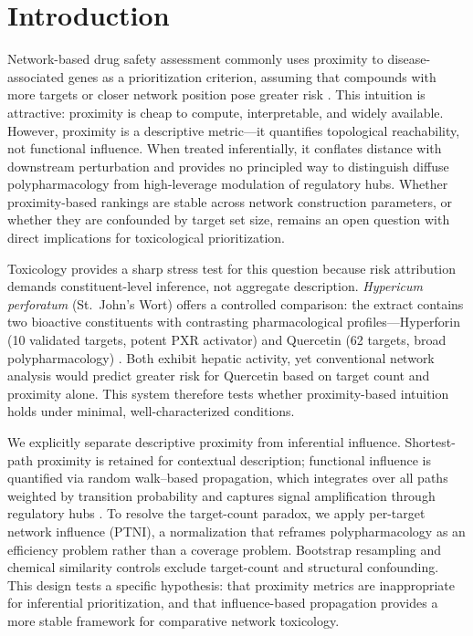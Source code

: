 \section{Introduction}

Network-based drug safety assessment commonly uses proximity to disease-associated genes as a prioritization criterion, assuming that compounds with more targets or closer network position pose greater risk \citep{Hopkins2008, Barabasi2011, Guney2016, Menche2015}.
This intuition is attractive: proximity is cheap to compute, interpretable, and widely available.
However, proximity is a descriptive metric---it quantifies topological reachability, not functional influence.
When treated inferentially, it conflates distance with downstream perturbation and provides no principled way to distinguish diffuse polypharmacology from high-leverage modulation of regulatory hubs.
Whether proximity-based rankings are stable across network construction parameters, or whether they are confounded by target set size, remains an open question with direct implications for toxicological prioritization.

Toxicology provides a sharp stress test for this question because risk attribution demands constituent-level inference, not aggregate description.
\textit{Hypericum perforatum} (St.\ John's Wort) offers a controlled comparison: the extract contains two bioactive constituents with contrasting pharmacological profiles---Hyperforin (10 validated targets, potent PXR activator) and Quercetin (62 targets, broad polypharmacology) \citep{Nahrstedt1997, Moore2000, Boots2008}.
Both exhibit hepatic activity, yet conventional network analysis would predict greater risk for Quercetin based on target count and proximity alone.
This system therefore tests whether proximity-based intuition holds under minimal, well-characterized conditions.

We explicitly separate descriptive proximity from inferential influence.
Shortest-path proximity is retained for contextual description; functional influence is quantified via random walk--based propagation, which integrates over all paths weighted by transition probability and captures signal amplification through regulatory hubs \citep{Kohler2008}.
To resolve the target-count paradox, we apply per-target network influence (PTNI), a normalization that reframes polypharmacology as an efficiency problem rather than a coverage problem.
Bootstrap resampling and chemical similarity controls exclude target-count and structural confounding.
This design tests a specific hypothesis: that proximity metrics are inappropriate for inferential prioritization, and that influence-based propagation provides a more stable framework for comparative network toxicology.
